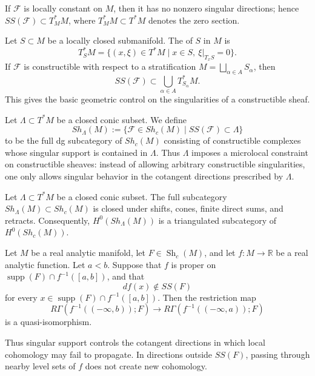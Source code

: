 {If \(\mathcal F\) is locally constant on \(M\), then it has no nonzero
singular directions; hence \(SS(\mathcal F)\subset T_M^*M\), where
\(T_M^*M\subset T^*M\) denotes the zero section.

Let \(S\subset M\) be a locally closed submanifold.  The
 of \(S\) in \(M\) is
\[
T_S^*M
=
\{(x,\xi)\in T^*M\mid x\in S,\ \xi|_{T_xS}=0\}.
\]
If \(\mathcal F\) is constructible with respect to a stratification
\(M=\bigsqcup_{\alpha\in A}S_\alpha\), then
\[
SS(\mathcal F)\subset \bigcup_{\alpha\in A}T^*_{S_\alpha}M.
\]
This gives the basic geometric control on the singularities of a
constructible sheaf.

Let \(\Lambda\subset T^*M\) be a closed conic subset.  We define
\[
Sh_\Lambda(M)
:=
\{\mathcal F\in Sh_c(M)\mid SS(\mathcal F)\subset \Lambda\}
\]
to be the full dg subcategory of \(Sh_c(M)\) consisting of constructible
complexes whose singular support is contained in \(\Lambda\).  Thus
\(\Lambda\) imposes a microlocal constraint on constructible sheaves:
instead of allowing arbitrary constructible singularities, one only
allows singular behavior in the cotangent directions prescribed by
\(\Lambda\).

\begin{theorem}
Let \(\Lambda\subset T^*M\) be a closed conic subset.  The full
subcategory \(Sh_\Lambda(M)\subset Sh_c(M)\) is closed under shifts,
cones, finite direct sums, and retracts.  Consequently,
\(H^0(Sh_\Lambda(M))\) is a triangulated subcategory of
\(H^0(Sh_c(M))\).
\end{theorem}
\begin{theorem}
Let \(M\) be a real analytic manifold, let
\(F\in \operatorname{Sh}_c(M)\), and let \(f:M\to \mathbb R\) be a real
analytic function. Let \(a<b\). Suppose that \(f\) is proper on
\(\operatorname{supp}(F)\cap f^{-1}([a,b])\), and that
\[
df(x)\notin SS(F)
\]
for every \(x\in \operatorname{supp}(F)\cap f^{-1}([a,b])\). Then the
restriction map
\[
R\Gamma(f^{-1}((-\infty,b));F)
\longrightarrow
R\Gamma(f^{-1}((-\infty,a));F)
\]
is a quasi-isomorphism.
\end{theorem}

Thus singular support controls the cotangent directions in which local
cohomology may fail to propagate. In directions outside \(SS(F)\), passing
through nearby level sets of \(f\) does not create new cohomology.
\endgroup}